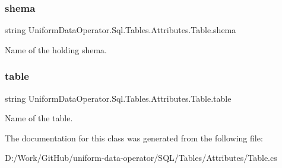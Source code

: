 \subsubsection{\texorpdfstring{shema}{shema}}
{\footnotesize\ttfamily string Uniform\+Data\+Operator.\+Sql.\+Tables.\+Attributes.\+Table.\+shema}



Name of the holding shema. 

\mbox{\label{class_uniform_data_operator_1_1_sql_1_1_tables_1_1_attributes_1_1_table_a107099bc2c29a01d3d4885751fe49c98}} 
\subsubsection{\texorpdfstring{table}{table}}
{\footnotesize\ttfamily string Uniform\+Data\+Operator.\+Sql.\+Tables.\+Attributes.\+Table.\+table}



Name of the table. 



The documentation for this class was generated from the following file\+:\begin{DoxyCompactItemize}
\item 
D\+:/\+Work/\+Git\+Hub/uniform-\/data-\/operator/\+S\+Q\+L/\+Tables/\+Attributes/Table.\+cs\end{DoxyCompactItemize}
